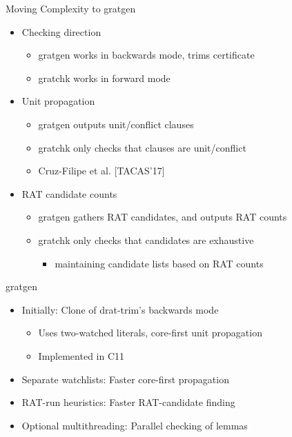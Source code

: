 \documentclass[fleqn]{beamer}
\newcommand\CC{C\nolinebreak[4]\hspace{-.05em}\raisebox{.3ex}{\relsize{-1}{\textbf{++}}}}
\begin{document}
\begin{frame}{Moving Complexity to gratgen}
  \begin{itemize}
   \item<+-> Checking direction
    \begin{itemize}
     \item gratgen works in backwards mode, trims certificate
     \item gratchk works in forward mode
    \end{itemize}
   \item<+-> Unit propagation
    \begin{itemize}
     \item gratgen outputs unit/conflict clauses
     \item gratchk only checks that clauses are unit/conflict
     \item Cruz-Filipe et al. [TACAS'17]
    \end{itemize}
   \item<+-> RAT candidate counts
    \begin{itemize}
     \item gratgen gathers RAT candidates, and outputs RAT counts
     \item gratchk only checks that candidates are exhaustive
      \begin{itemize}
       \item maintaining candidate lists based on RAT counts
    
      \end{itemize}
    \end{itemize}
  \end{itemize}
\end{frame}
\begin{frame}{gratgen}
  \begin{itemize}
   \item<+-> Initially: Clone of drat-trim's backwards mode
    \begin{itemize}
     \item Uses two-watched literals, core-first unit propagation
     \item Implemented in \CC11
    \end{itemize}
   \item<+->[+] Separate watchlists: Faster core-first propagation
   \item<+->[+] RAT-run heuristics: Faster RAT-candidate finding
   \item<+->[+] Optional multithreading: Parallel checking of lemmas
    
  \end{itemize}
\end{frame}
\end{document}
